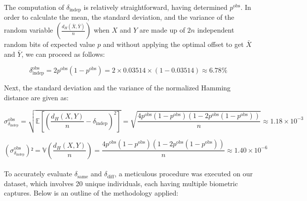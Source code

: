 The computation of \( \delta_{\text{indep}} \) is relatively straightforward, having determined \( p^{\text{obs}} \). In order to calculate the mean, the standard deviation, and the variance of the random variable \(\left( \frac{d_H(\bar{X}, \bar{Y})}{n} \right)\) when \(X\) and \(Y\) are made up of \(2n\) independent random bits of expected value \(p\) and without applying the optimal offset to get \(\bar{X}\) and \(\bar{Y}\), we can proceed as follows:

\[ \delta^{\text{obs}}_{\text{indep}} = 2p^{\text{obs}}(1 - p^{\text{obs}}) = 2 \times 0.03514 \times (1 - 0.03514) \approx 6.78\% \]

Next, the standard deviation and the variance of the normalized Hamming distance are given as:

\[ {\sigma^{\text{obs}}_{\delta_{\text{indep}}}} = \sqrt{\mathbb{E} \left[ \left( \frac{d_H(X, Y)}{n} - \delta_{\text{indep}} \right)^2 \right]} = \sqrt{\frac{4p^{\text{obs}}(1 - p^{\text{obs}})(1 - 2p^{\text{obs}}(1 - p^{\text{obs}}))}{n}} \approx 1.18 \times 10^{-3} \]

\[ ({\sigma^{\text{obs}}_{\delta_{\text{indep}}}})² = \mathbb{V}\left( \frac{d_H(X, Y)}{n} \right) = \frac{4p^{\text{obs}}(1 - p^{\text{obs}})(1 - 2p^{\text{obs}}(1 - p^{\text{obs}}))}{n} \approx 1.40 \times 10^{-6} \]\\

To accurately evaluate \( \delta_{\text{same}} \) and \( \delta_{\text{diff}} \), a meticulous procedure was executed on our dataset, which involves 20 unique individuals, each having multiple biometric captures. Below is an outline of the methodology applied:

